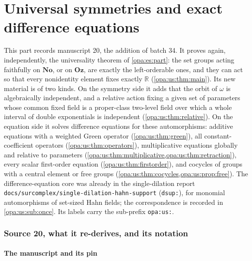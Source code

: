 \documentclass[11pt,oneside]{article}
\numberwithin{equation}{section}
\theoremstyle{definition}
\theoremstyle{remark}
\newcommand{\No}{\mathbf{No}}
\newcommand{\Oz}{\mathbf{Oz}}
\newcommand{\R}{\mathbb R}
\newcommand{\lbl}[1]{\nolinkurl{#1}}
\newcommand{\fn}[1]{\nolinkurl{#1}}
\begin{document}
\part{Universal symmetries and exact difference equations}\label{opa:us:part}

This part records manuscript 20, the addition of batch 34. It proves again, independently, the universality theorem of
\cref{opa:es:part}: the set groups acting faithfully on $\No$, or on $\Oz$, are exactly the left-orderable ones, and they can act so
that every nonidentity element fixes exactly $\R$ (\cref{opa:us:thm:main}). Its new material is of two kinds. On the symmetry side it
adds that the orbit of $\omega$ is algebraically independent, and a relative action fixing a given set of parameters whose common
fixed field is a proper-class two-level field over which a whole interval of double exponentials is independent
(\cref{opa:us:thm:relative}). On the equation side it solves difference equations for these automorphisms: additive equations with
a weighted Green operator (\cref{opa:us:thm:green}), all constant-coefficient operators (\cref{opa:us:thm:operators}),
multiplicative equations globally and relative to parameters (\cref{opa:us:thm:multiplicative,opa:us:thm:retraction}), every
scalar first-order equation (\cref{opa:us:thm:firstorder}), and cocycles of groups with a central element or free groups
(\cref{opa:us:thm:cocycles,opa:us:prop:free}). The difference-equation core was already in the single-dilation report
\fn{docs/surcomplex/single-dilation-hahn-support} (\lbl{dsup:}), for monomial automorphisms of set-sized Hahn fields; the
correspondence is recorded in \cref{opa:us:sub:once}. Its labels carry the sub-prefix \lbl{opa:us:}.

\section{Source 20, what it re-derives, and its notation}\label{opa:us:sec:intro}

\subsection{The manuscript and its pin}\label{opa:us:sub:source}
\end{document}
